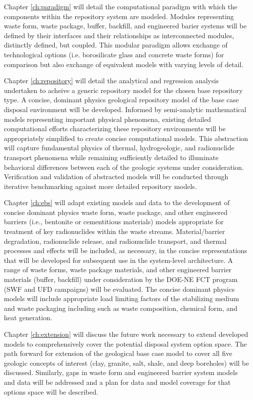 Chapter \ref{ch:paradigm} will detail the computational 
paradigm with which the components within the repository system are 
modeled. Modules representing waste form, waste package, buffer, 
backfill, and engineered barier systems will be defined by their 
interfaces and their relationships as interconnected modules, 
distinctly defined, but coupled. This modular paradigm allows exchange  
of technological options (i.e. borosilicate glass and concrete waste 
forms) for comparison but also exchange of equivalent models with 
varying levels of detail.

Chapter \ref{ch:repository} will detail the analytical and regression 
analysis undertaken to acheive a generic repository model for the 
chosen base repository type. A concise, dominant physics geological 
repository model of the base case disposal environment will be 
developed. Informed by semi-analytic mathematical models representing 
important physical phenomena, existing detailed computational efforts 
characterizing these repository environments will be appropriately 
simplified to create concise computational models. This abstraction 
will capture fundamental physics of thermal, hydrogeologic, and 
radionuclide transport phenomena while remaining sufficiently detailed 
to illuminate behavioral differences between each of the geologic 
systems under consideration.  Verification and validation of 
abstracted models will be conducted through iterative benchmarking 
against more detailed repository models.

Chapter \ref{ch:ebs} will adapt existing models and data to the 
development of concise dominant physics waste form, waste package, and 
other engineered barriers (i.e., bentonite or cementitious materials) 
models appropriate for treatment of key radionuclides within the waste 
streams.  Material/barrier degradation, radionuclide release, and 
radionuclide transport, and thermal processes and effects will be 
included, as necessary, in the concise representations that will be 
developed for subsequent use in the system-level architecture. A range 
of waste forms, waste package materials, and other engineered barrier 
materials (buffer, backfill) under consideration by the DOE-NE FCT 
program (SWF and UFD campaigns) will be evaluated. The concise 
dominant physics models will include appropriate load limiting factors 
of the stabilizing medium and waste packaging including such as waste 
composition, chemical form, and heat generation.

Chapter \ref{ch:extension} will discuss the future work necessary to 
extend developed models to comprehensively cover the potential 
disposal system option space. The path forward for extension of the 
geological base case model to cover all five geologic concepts of 
interest (clay, granite, salt, shale, and deep boreholes) will be 
discussed. Similarly, gaps in waste form and engineered barrier system 
models and data will be addressed and a plan for data and model 
coverage for that options space will be described.

